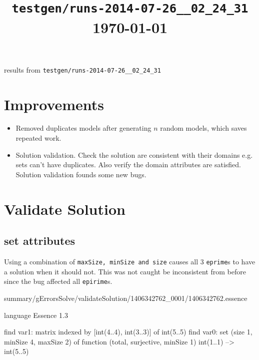 
\usepackage[left=48pt,right=46pt]{geometry}

\title{ \lstinline!testgen/runs-2014-07-26__02_24_31! \\\vspace{2pt}\small{\rm \today} \vspace{-0.5cm}}

\maketitle

results from \lstinline!testgen/runs-2014-07-26__02_24_31!

\section{Improvements}

\begin{itemize}
	\item Removed duplicates models after generating $n$ random models, which saves repeated work.
	\item Solution validation. Check the solution are consistent with their domains e.g. sets can't have duplicates. Also verify the domain attributes are satisfied.  Solution validation founds some new bugs.
\end{itemize}

\section{Validate Solution}

\subsection{set attributes}

Using a combination of \texttt{maxSize, minSize and size} causes all 3 \texttt{eprime}s to have a solution when it should not. This was not caught be inconsistent from before since the bug affected all \texttt{epirime}s.


\begin{lst:essence}[caption=1406342762.essence]
summary/gErrorsSolve/validateSolution/1406342762_0001/1406342762.essence

language Essence 1.3

find var1: matrix indexed by [int(4..4), int(3..3)] of int(5..5)
find var0:
        set (size 1, minSize 4, maxSize 2) of
            function (total, surjective, minSize 1) int(1..1) --> int(5..5)
\end{lst:essence}

